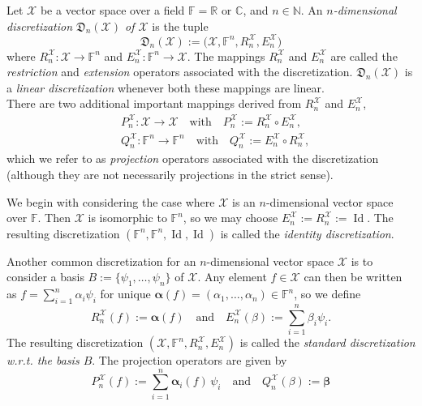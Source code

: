 \documentclass[a4paper]{paper}
\makeatletter
\newcommand{\Discr}{\mathfrak{D}}
\newcommand{\Spc}[1]{\mathscr{#1}}
\newcommand{\Field}{\mathbb{F}}
\newcommand{\Real}{\mathbb{R}}
\newcommand{\Complex}{\mathbb{C}}
\newcommand{\Natural}{\mathbb{N}}
\newcommand*{\EXT}[2]{\ensuremath{E_{#1}^{#2}}}
\newcommand*{\REST}[2]{\ensuremath{R_{#1}^{#2}}}
\newcommand*{\PROJ}[2]{\ensuremath{P_{#1}^{#2}}}
\newcommand*{\COPROJ}[2]{\ensuremath{Q_{#1}^{#2}}}
\newcommand*{\RnX}{\ensuremath{\REST{n}{\Spc{X}}}}
\newcommand*{\EnX}{\ensuremath{\EXT{n}{\Spc{X}}}}
\newcommand*{\PnX}{\ensuremath{\PROJ{n}{\Spc{X}}}}
\newcommand*{\QnX}{\ensuremath{\COPROJ{n}{\Spc{X}}}}
\DeclareMathOperator{\Id}{Id}
\newcommand{\wrt}{{w.r.t.}\@\xspace}
\newcommand{\valpha}{\boldsymbol{\alpha}}
\newcommand{\vbeta}{\boldsymbol{\beta}}
\makeatother
\begin{document}
\begin{definition}
 \label{def:space_discretization}
 Let $\Spc{X}$ be a vector space over a field $\Field = \Real \text{ or } \Complex$, and $n \in \Natural$.
 An \emph{$n$-dimensional discretization $\Discr_{n}(\Spc{X})$ of $\Spc{X}$} is the tuple
 \begin{equation*}
  \Discr_{n}(\Spc{X}) := \bigl( \Spc{X}, \Field^{n}, \RnX, \EnX \bigr) 
 \end{equation*}
 where $\RnX \colon \Spc{X} \to \Field^{n}$ and $\EnX \colon \Field^{n} \to \Spc{X}$. The mappings $\RnX$ and $\EnX$ 
 are called the \emph{restriction} and \emph{extension} operators associated with the discretization. 
 $\Discr_n(\Spc{X})$ is a \emph{linear discretization} whenever both these mappings are linear.\\
 There are two additional important mappings derived from $\RnX$ and $\EnX$,
 \begin{align*}
  & \PnX \colon \Spc{X} \to \Spc{X} \quad \text{with} \quad \PnX := \RnX \circ \EnX, \\
  & \QnX \colon \Field^n \to \Field^n \quad \text{with} \quad \QnX := \EnX \circ \RnX,
 \end{align*}
 which we refer to as \emph{projection} operators associated with the discretization (although they are not 
necessarily  projections in the strict sense).
\end{definition}

\begin{examp}
 We begin with considering the case where $\Spc{X}$ is an $n$-dimensional vector space over $\Field$. Then $\Spc{X}$ is 
 isomorphic to $\Field^{n}$, so we may choose $\EnX:=\RnX:=\Id$. The resulting discretization $( \Field^n, \Field^n, 
\Id, \Id )$ is called 
 the \emph{identity discretization}. 
\end{examp}

\begin{examp}
 Another common discretization for an $n$-dimensional vector space $\Spc{X}$ is to consider a basis 
 $B:=\{\psi_1,\ldots, \psi_{n}\}$ of $\Spc{X}$. Any element $f \in \Spc{X}$ can then be written as 
 $f = \sum_{i=1}^n \alpha_i \psi_i$ for unique $\valpha(f) = (\alpha_1, \ldots, \alpha_{n})\in\Field^n$, so we define
 \begin{equation*}
  \RnX(f) := \valpha(f) \quad \text{and} \quad \EnX(\beta) := \sum_{i=1}^n \beta_i \psi_i. 
 \end{equation*}
 The resulting discretization $( \Spc{X}, \Field^{n}, \RnX, \EnX )$ is called the \emph{standard discretization \wrt 
 the basis $B$}. The projection operators are given by
 \begin{equation*}
  \PnX(f) := \sum_{i=1}^n \valpha_i(f)\, \psi_i \quad \text{and} \quad \QnX(\beta) := \vbeta
 \end{equation*}

\end{examp}
\end{document}
